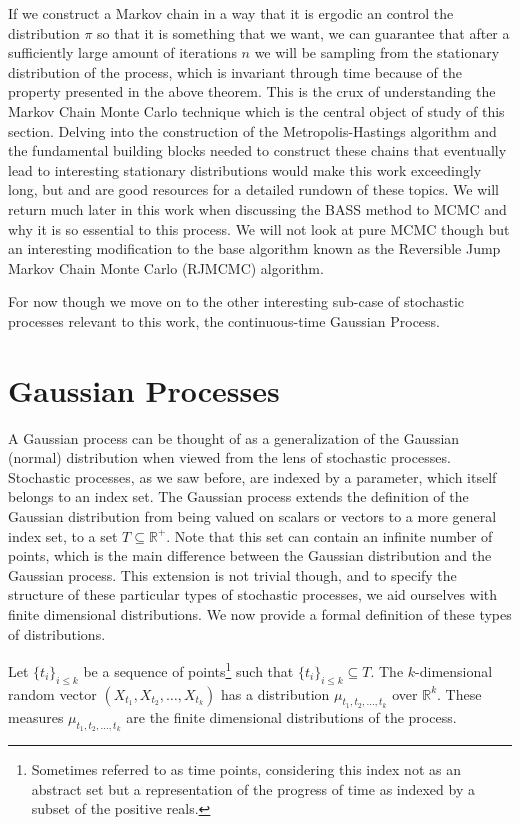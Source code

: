 If we construct a Markov chain in a way that it is ergodic an control the distribution $\pi$ so that it is something that we want, we can guarantee that after a sufficiently large amount of iterations $n$ we will be sampling from the stationary distribution of the process, which is invariant through time because of the property presented in the above theorem. This is the crux of understanding the Markov Chain Monte Carlo technique which is the central object of study of this section. Delving into the construction of the Metropolis-Hastings algorithm and the fundamental building blocks needed to construct these chains that eventually lead to interesting stationary distributions would make this work exceedingly long, but \cite{rubinstein2016simulation} and \cite{robert1999monte} are good resources for a detailed rundown of these topics. We will return much later in this work when discussing the BASS method to MCMC and why it is so essential to this process. We will not look at pure MCMC though but an interesting modification to the base algorithm known as the Reversible Jump Markov Chain Monte Carlo (RJMCMC) algorithm. 

For now though we move on to the other interesting sub-case of stochastic processes relevant to this work, the continuous-time Gaussian Process. 

\section{Gaussian Processes}

A Gaussian process can be thought of as a generalization of the Gaussian (normal) distribution when viewed from the lens of stochastic processes. Stochastic processes, as we saw before, are indexed by a parameter, which itself belongs to an index set. The Gaussian process extends the definition of the Gaussian distribution from being valued on scalars or vectors to a more general index set, to a set $T \subseteq \mathbb{R}^+$. Note that this set can contain an infinite number of points, which is the main difference between the Gaussian distribution and the Gaussian process. This extension is not trivial though, and to specify the structure of these particular types of stochastic processes, we aid ourselves with finite dimensional distributions. We now provide a formal definition of these types of distributions. 

\begin{definition}
	Let $\{ t_i \}_{i \leq k}$ be a sequence of points\footnote{Sometimes referred to as time points, considering this index not as an abstract set but a representation of the progress of time as indexed by a subset of the positive reals.} such that $\{ t_i \}_{i \leq k} \subseteq T$. The $k$-dimensional random vector $(X_{t_1}, X_{t_2}, \ldots, X_{t_k})$ has a distribution $\mu_{t_1, t_2, \ldots, t_k}$ over $\mathbb{R}^k$. These measures $\mu_{t_1, t_2, \ldots, t_k}$ are the finite dimensional distributions of the process. 
\end{definition}

